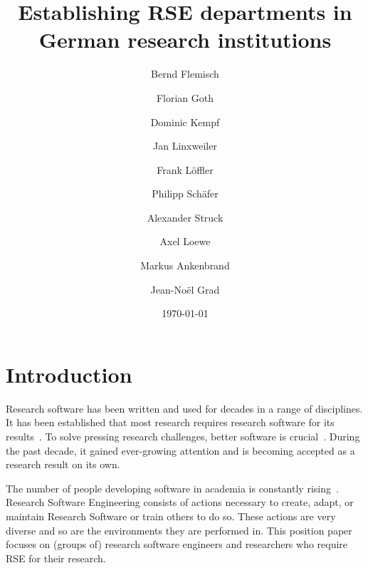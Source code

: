 \documentclass[a4paper]{article}
\title{Establishing RSE departments in German research institutions}
\author{
    Bernd Flemisch
    \and
    Florian Goth
    \and
    Dominic Kempf
    \and
    Jan Linxweiler
    \and
    Frank Löffler
    \and
    Philipp Schäfer
    \and
    Alexander Struck
    \and
    Axel Loewe
    \and
    Markus Ankenbrand
    \and
    Jean-Noël Grad
}
\date{\today}
\begin{document}
\maketitle

\section{Introduction}
Research software has been written and used for decades in a range of disciplines.
It has been established that most research requires research software for its results~\autocite{Hannay2009, Hettrick2015}.
To solve pressing research challenges, better software is crucial~\autocite{Goble2014}.
During the past decade, it gained ever-growing attention and is becoming accepted as a research result on its own.

The number of people developing software in academia is constantly rising~\autocite{Hannay2009, Hettrick2015}.
Research Software Engineering consists of actions necessary to create, adapt, or maintain Research Software or train others to do so.
These actions are very diverse and so are the environments they are performed in.
This position paper focuses on (groups of) research software engineers and researchers who require RSE for their research.
\end{document}
